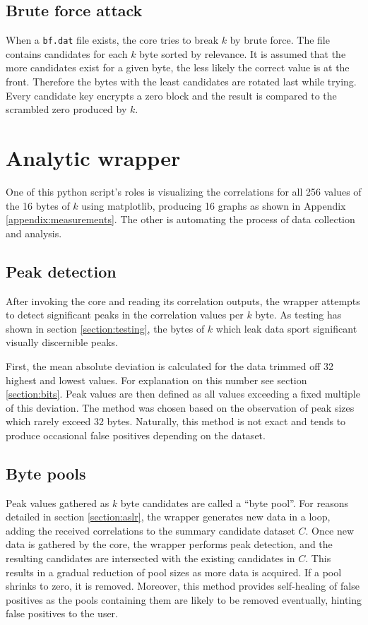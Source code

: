 \documentclass[thesis=B,english]{FITthesis}[2019/03/06]
\begin{document}
\subsection{Brute force attack}
When a \verb'bf.dat' file exists, the core tries to break $k$ by brute force. The file contains candidates for each $k$ byte sorted by relevance.
It is assumed that the more candidates exist for a given byte, the less likely the correct value is at the front.
Therefore the bytes with the least candidates are rotated last while trying.
Every candidate key encrypts a zero block and the result is compared to the scrambled zero produced by $k$.

\section{Analytic wrapper}
\label{section:wrapper}
One of this python script's roles is visualizing the correlations for all 256 values of the 16 bytes of $k$ using matplotlib, producing 16 graphs as shown in Appendix \ref{appendix:measurements}.
The other is automating the process of data collection and analysis.

\subsection{Peak detection}
After invoking the core and reading its correlation outputs, the wrapper attempts to detect significant peaks in the correlation values per $k$ byte.
As testing has shown in section \ref{section:testing}, the bytes of $k$ which leak data sport significant visually discernible peaks.

First, the mean absolute deviation is calculated for the data trimmed off 32 highest and lowest values. For explanation on this number see section \ref{section:bits}.
Peak values are then defined as all values exceeding a fixed multiple of this deviation.
The method was chosen based on the observation of peak sizes which rarely exceed 32 bytes.
Naturally, this method is not exact and tends to produce occasional false positives depending on the dataset.

\subsection{Byte pools}
Peak values gathered as $k$ byte candidates are called a ``byte pool''.
For reasons detailed in section \ref{section:aslr}, the wrapper generates new data in a loop, adding the received correlations to the summary candidate dataset $C$.
Once new data is gathered by the core, the wrapper performs peak detection, and the resulting candidates are intersected with the existing candidates in $C$.
This results in a gradual reduction of pool sizes as more data is acquired. If a pool shrinks to zero, it is removed.
Moreover, this method provides self-healing of false positives as the pools containing them are likely to be removed eventually, hinting false positives to the user.
\end{document}
